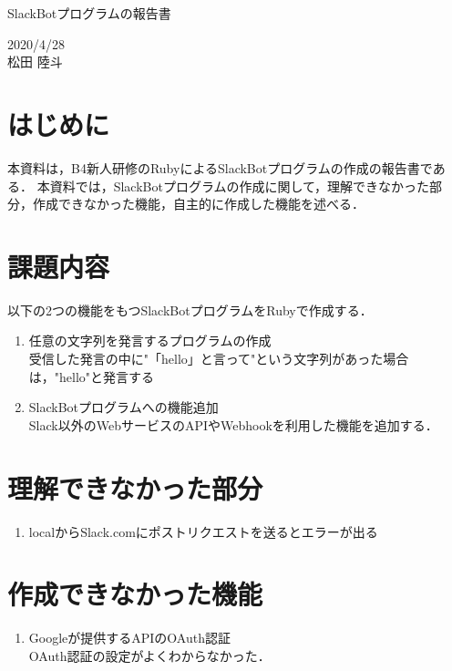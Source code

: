 \documentclass[12pt]{jsarticle}
\begin{document}
\begin{center}
{\LARGE SlackBotプログラムの報告書}
\end{center}

\begin{flushright}
  2020/4/28\\
  松田 陸斗
\end{flushright}
\section{はじめに}
\label{sec:introduction}
本資料は，B4新人研修のRubyによるSlackBotプログラムの作成の報告書である．
本資料では，SlackBotプログラムの作成に関して，理解できなかった部分，作成できなかった機能，自主的に作成した機能を述べる．

\section{課題内容}
以下の2つの機能をもつSlackBotプログラムをRubyで作成する．
\begin{enumerate}
\item 任意の文字列を発言するプログラムの作成\\
受信した発言の中に"「hello」と言って"という文字列があった場合は，"hello"と発言する
\item SlackBotプログラムへの機能追加\\
Slack以外のWebサービスのAPIやWebhookを利用した機能を追加する．
\end{enumerate}

\section{理解できなかった部分}
\begin{enumerate}
\item 	localからSlack.comにポストリクエストを送るとエラーが出る\\
\end{enumerate}

\section{作成できなかった機能}
\begin{enumerate}
\item Googleが提供するAPIのOAuth認証\\
OAuth認証の設定がよくわからなかった．
\end{enumerate}
\end{document}
